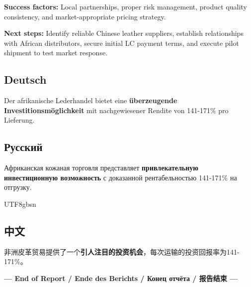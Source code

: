 \documentclass[12pt,a4paper]{article}
\begin{document}
\textbf{Success factors:} Local partnerships, proper risk management, product quality consistency, and market-appropriate pricing strategy.

\textbf{Next steps:} Identify reliable Chinese leather suppliers, establish relationships with African distributors, secure initial LC payment terms, and execute pilot shipment to test market response.

\subsection*{Deutsch}
Der afrikanische Lederhandel bietet eine \textbf{überzeugende Investitionsmöglichkeit} mit nachgewiesener Rendite von 141-171\% pro Lieferung.

\subsection*{Русский}
Африканская кожаная торговля представляет \textbf{привлекательную инвестиционную возможность} с доказанной рентабельностью 141-171\% на отгрузку.

\begin{CJK}{UTF8}{gbsn}
\subsection*{中文}
非洲皮革贸易提供了一个\textbf{引人注目的投资机会}，每次运输的投资回报率为141-171\%。
\end{CJK}

\vspace{2cm}

\begin{center}
\textbf{\Large --- End of Report / Ende des Berichts / Конец отчёта / 报告结束 ---}
\end{center}
\end{document}
